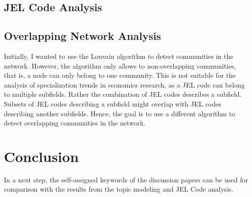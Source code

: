 \documentclass[11pt, a4paper, leqno]{article}
\begin{document}
\subsection{JEL Code Analysis}

\subsection{Overlapping Network Analysis}
Initially, I wanted to use the Louvain algorithm to detect communities in the network.
However, the algorithm only allows to non-overlapping communities, that is, a node can only belong to one community.
This is not suitable for the analysis of specialization trends in economics research, as a JEL code can belong to multiple subfields.
Rather the combination of JEL codes describes a subfield.
Subsets of JEL codes describing a subfield might overlap with JEL codes describing another subfields.
Hence, the goal is to use a different algorithm to detect overlapping communities in the network.


\clearpage

\section{Conclusion}
In a next step, the self-assigned keywords of the discussion papers can be used for comparison with the results from the topic modeling and JEL Code analysis.

\printbibliography
\end{document}
